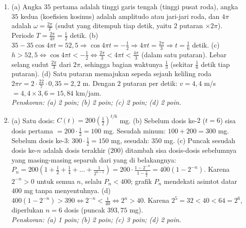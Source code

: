 \documentclass[a4paper,11pt]{article}
\begin{document}
\begin{enumerate}[leftmargin=2em,itemsep=3pt,topsep=2pt]
\item[\textbf{4.}] (a) Angka $35$ pertama adalah tinggi garis tengah (tinggi pusat roda), angka $35$ kedua (koefisien kosinus) adalah amplitudo atau jari-jari roda, dan $4\pi$ adalah $\omega=\frac{2\pi}{T}$ (sudut yang ditempuh tiap detik, yaitu $2$ putaran $\times2\pi$). Periode $T=\frac{2\pi}{4\pi}=\frac12$ detik. (b) $35-35\cos4\pi t=52{,}5\Rightarrow\cos4\pi t=-\frac12\Rightarrow4\pi t=\frac{2\pi}3\Rightarrow t=\frac16$ detik. (c) $h>52{,}5\iff\cos4\pi t<-\frac12\iff\frac{2\pi}3<4\pi t<\frac{4\pi}3$ (dalam satu putaran). Lebar selang sudut $\frac{2\pi}3$ dari $2\pi$, sehingga bagian waktunya $\frac13$ (sekitar $\frac16$ detik tiap putaran). (d) Satu putaran memajukan sepeda sejauh keliling roda $2\pi r=2\cdot\frac{22}7\cdot0{,}35=2{,}2$ m. Dengan $2$ putaran per detik: $v=4{,}4$ m/s $=4{,}4\times3{,}6=15{,}84$ km/jam. \\ \textit{Penskoran: (a) 2 poin; (b) 2 poin; (c) 2 poin; (d) 2 poin.}
\item[\textbf{5.}] (a) Satu dosis: $C(t)=200\left(\frac12\right)^{t/6}$ mg. (b) Sebelum dosis ke-$2$ ($t=6$) sisa dosis pertama $=200\cdot\frac12=100$ mg. Sesudah minum: $100+200=300$ mg. Sebelum dosis ke-$3$: $300\cdot\frac12=150$ mg, sesudah: $350$ mg. (c) Puncak sesudah dosis ke-$n$ adalah dosis terakhir ($200$) ditambah sisa dosis-dosis sebelumnya yang masing-masing separuh dari yang di belakangnya: $P_n=200\left(1+\frac12+\frac14+\dots+\frac1{2^{n-1}}\right)=200\cdot\frac{1-2^{-n}}{1-\frac12}=400\left(1-2^{-n}\right)$. Karena $2^{-n}>0$ untuk semua $n$, selalu $P_n<400$; grafik $P_n$ mendekati asimtot datar $400$ mg tanpa menyentuhnya. (d) $400(1-2^{-n})>390\iff2^{-n}<\frac1{40}\iff2^n>40$. Karena $2^5=32<40<64=2^6$, diperlukan $n=6$ dosis (puncak $393{,}75$ mg). \\ \textit{Penskoran: (a) 1 poin; (b) 2 poin; (c) 3 poin; (d) 2 poin.}
\end{enumerate}
\end{document}
